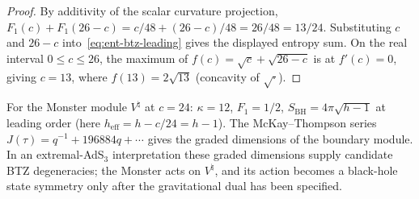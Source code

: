 \begin{proof}
By additivity of the scalar curvature projection,
$F_1(c) + F_1(26-c) = c/48 + (26-c)/48 = 26/48 = 13/24$.
Substituting $c$ and $26-c$ into~\eqref{eq:ent-btz-leading} gives
the displayed entropy sum.
On the real interval \(0\le c\le26\), the maximum of
$f(c) = \sqrt{c} + \sqrt{26-c}$ is at
$f'(c) = 0$, giving $c = 13$, where
$f(13) = 2\sqrt{13}$ (concavity of $\sqrt{\cdot}$).
\end{proof}

\begin{remark}
\label{rem:ent-btz-monster}
For the Monster module $V^\natural$ at $c = 24$:
$\kappa = 12$, $F_1 = 1/2$,
$S_{\mathrm{BH}} = 4\pi\sqrt{h-1}$ at leading order
\textup{(}here $h_{\mathrm{eff}} = h - c/24 = h - 1$\textup{)}.
The McKay--Thompson series
$J(\tau) = q^{-1} + 196884q + \cdots$ gives the graded dimensions of
the boundary module.  In an extremal-AdS$_3$ interpretation these
graded dimensions supply candidate BTZ degeneracies; the Monster acts
on $V^\natural$, and its action becomes a black-hole state symmetry
only after the gravitational dual has been specified.
\end{remark}

